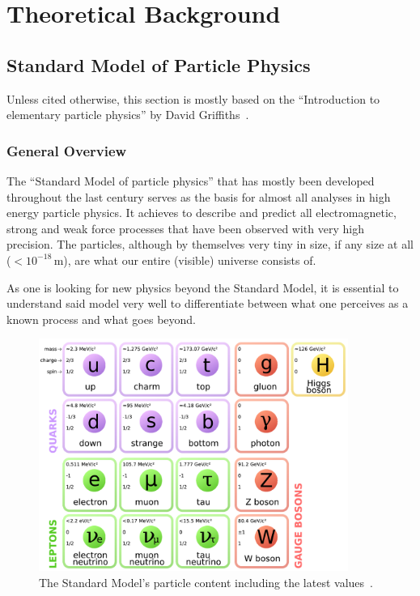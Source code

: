 
\chapter{Theoretical Background}
\pagestyle{fancy}
\section{Standard Model of Particle Physics}

Unless cited otherwise, this section is mostly based on the ``Introduction to elementary particle physics'' by David Griffiths~\cite{griffiths}.

\subsection{General Overview}
\label{sec:stdmdloverview}

The ``Standard Model of particle physics'' that has mostly been developed throughout the last century serves as the basis for almost all analyses in high energy particle physics. It achieves to describe and predict all electromagnetic, strong and weak force processes that have been observed with very high precision. The particles, although by themselves very tiny in size, if any size at all ($< 10^{-18}\,\text{m}$), are what our entire (visible) universe consists of.

As one is looking for new physics beyond the Standard Model, it is essential to understand said model very well to differentiate between what one perceives as a known process and what goes beyond.

\begin{figure}[ht!]
  \centering
    \includegraphics[width=0.9\textwidth]{plots/Standard_Model_of_Elementary_Particles.pdf}
  \caption{The Standard Model's particle content including the latest values~\cite{stdmdlparticles,pdg}.}
  \label{fig:standardmodel}
\end{figure}

